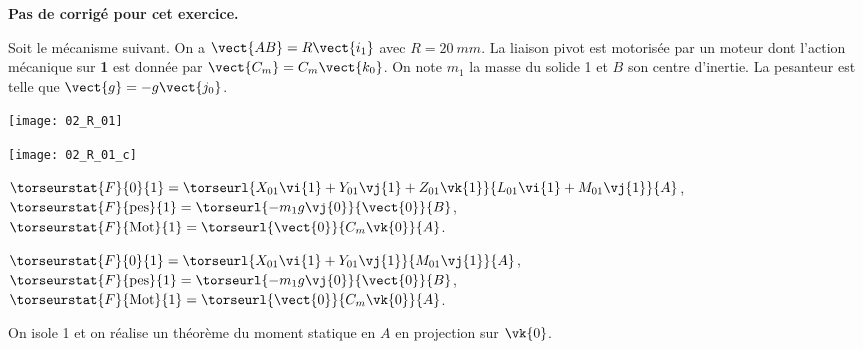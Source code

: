 \normaltrue
\correctiontrue


\setcounter{numques}{0}
\ifcorrection
\else
\textbf{Pas de corrigé pour cet exercice.}
\fi

\ifprof
\else
Soit le mécanisme suivant. On a $\vect{AB}=R\vect{i_1}$ avec $R=\SI{20}{mm}$. La liaison pivot est motorisée par un moteur dont l'action mécanique sur \textbf{1} est donnée par $\vect{C_m}=C_m \vect{k_0}$.
On note $m_1$ la masse du solide 1 et $B$ son centre d'inertie. 
 La pesanteur est telle que $\vect{g}=-g\vect{j_0}$.

\begin{center}
\texttt{[image: 02\_R\_01]}
\end{center}
\fi

\ifprof
\begin{center}
\texttt{[image: 02\_R\_01\_c]}
\end{center}
\else
\fi

\ifprof
$\torseurstat{F}{0}{1}=\torseurl{X_{01}\vi{1}+Y_{01}\vj{1}+Z_{01}\vk{1}}{L_{01}\vi{1}+M_{01}\vj{1}}{A}$,
$\torseurstat{F}{\text{pes}}{1}=\torseurl{-m_1g\vj{0}}{\vect{0}}{B}$, 
$\torseurstat{F}{\text{Mot}}{1}=\torseurl{\vect{0}}{C_m\vk{0}}{A}$.
\else
\fi


\ifprof
$\torseurstat{F}{0}{1}=\torseurl{X_{01}\vi{1}+Y_{01}\vj{1}}{M_{01}\vj{1}}{A}$,
$\torseurstat{F}{\text{pes}}{1}=\torseurl{-m_1g\vj{0}}{\vect{0}}{B}$,
$\torseurstat{F}{\text{Mot}}{1}=\torseurl{\vect{0}}{C_m\vk{0}}{A}$.
\else
\fi

\ifprof
On isole 1 et on réalise un théorème du moment statique en $A$ en projection sur $\vk{0}$.
\else
\fi



